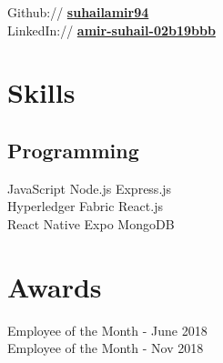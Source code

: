 \documentclass[letterpaper]{amir-resume} %
\begin{document}
\begin{minipage}[t]{0.33\textwidth}
Github:// \href{https://github.com/suhailamir94}{\bf suhailamir94} \\
LinkedIn:// \href{https://www.linkedin.com/in/amir-suhail-02b19bbb}{\bf amir-suhail-02b19bbb} \\
\sectionspace %


\section{Skills}

\subsection{Programming}

JavaScript \textbullet{} Node.js \textbullet{} Express.js \\
Hyperledger Fabric  \textbullet{} React.js  \\
React Native  \textbullet{} Expo \textbullet{} MongoDB

\sectionspace %


\section{Awards}

Employee of the Month - June 2018 \\
Employee of the Month - Nov 2018
\sectionspace %


\end{minipage} %
\hfill
%
%
\end{document}
